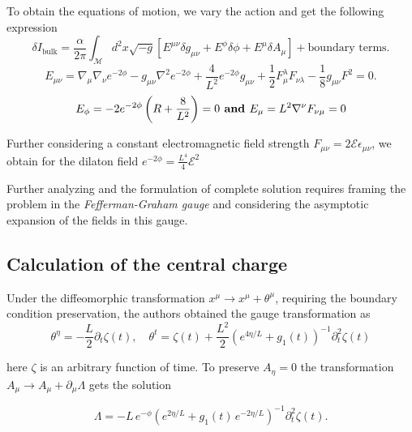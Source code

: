 To obtain the equations of motion, we vary the action and get the following expression 
\begin{equation}
    \delta I_{\text{bulk}} = \frac{\alpha}{2\pi} \int_{\mathcal{M}} d^2 x \sqrt{-g} \left[ E^{\mu\nu} \delta g_{\mu\nu} + E^{\phi} \delta \phi + E^{\mu} \delta A_{\mu} \right] + \text{boundary terms}.
\end{equation}
\begin{equation}
    E_{\mu\nu} = \nabla_{\mu}\nabla_{\nu}e^{-2\phi} - g_{\mu\nu}\nabla^2 e^{-2\phi} + \frac{4}{L^2}e^{-2\phi}g_{\mu\nu} + \frac{1}{2}F_{\mu}^{\lambda}F_{\nu\lambda} - \frac{1}{8}g_{\mu\nu}F^2 = 0.
\end{equation}
\begin{equation}
    E_{\phi} = -2e^{-2\phi}\left(R + \frac{8}{L^2}\right)=0 \text{\textbf{ and }} E_{\mu} = L^2\nabla^{\nu}F_{\nu\mu} = 0
\end{equation}

Further considering a constant electromagnetic field strength $F_{\mu\nu} = 2\mathcal{E}\epsilon_{\mu\nu}$, we obtain for the dilaton field $e^{-2\phi}=\displaystyle\frac{L^4}{4}\mathcal{E}^2$

Further analyzing and the formulation of complete solution requires framing the problem in the \textit{Fefferman-Graham gauge} \cite{Fefferman:1985} and considering the asymptotic expansion of the fields in this gauge. 

\subsection{Calculation of the central charge}
\label{subsec:central-charge-castro}
Under the diffeomorphic transformation $x^{\mu}\to x^{\mu}+\theta^{\mu}$, requiring the boundary condition preservation, the authors obtained the gauge transformation as 
\begin{equation}
    \theta^\eta = -\frac{L}{2}\partial_t\zeta(t), \quad \theta^t = \zeta(t) + \frac{L^2}{2}\left(e^{4\eta/L} + g_1(t)\right)^{-1}\partial_t^2\zeta(t)
\end{equation}

here $\zeta$ is an arbitrary function of time. To preserve $A_{\eta} = 0$ the transformation $A_{\mu}\to A_{\mu}+\partial_{\mu}\Lambda$ gets the solution 

\begin{equation}
    \Lambda = -L\,e^{-\phi}\left(e^{2\eta/L} + g_1(t)\,e^{-2\eta/L}\right)^{-1}\partial_t^2\zeta(t).
\end{equation}

